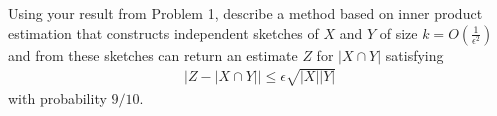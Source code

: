 \documentclass[10pt]{article}
\DeclareMathOperator{\R}{\mathbb{R}}
\begin{document}
Using your result from Problem 1, describe a method based on inner product estimation that constructs independent sketches of $X$ and $Y$ of size  $k = O\left(\frac{1}{\epsilon^2}\right)$ and from these sketches can return an estimate $Z$ for $|X\cap Y|$ satisfying
\begin{align*}
	\left|Z - |X\cap Y|\right| \leq \epsilon \sqrt{|X||Y|}
\end{align*}
with probability $9/10$.

%
%




\end{document}

